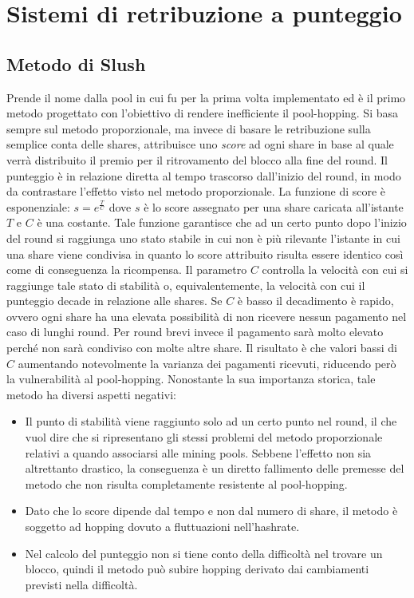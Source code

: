 \section{Sistemi di retribuzione a punteggio}

\subsection{Metodo di Slush}\label{pool-slush}

Prende il nome dalla pool in cui fu per la prima volta implementato ed è il primo metodo progettato con l'obiettivo di rendere inefficiente il pool-hopping.
Si basa sempre sul metodo proporzionale, ma invece di basare le retribuzione sulla semplice conta delle shares, attribuisce uno \emph{score} ad ogni share in base al quale verrà distribuito il premio per il ritrovamento del blocco alla fine del round.
Il punteggio è in relazione diretta al tempo trascorso dall'inizio del round, in modo da contrastare l'effetto visto nel metodo proporzionale. La funzione di score è esponenziale: $s=e^{\frac{T}{C}}$ dove $s$ è lo score assegnato per una share caricata all'istante $T$ e $C$ è una costante.
Tale funzione garantisce che ad un certo punto dopo l'inizio del round si raggiunga uno stato stabile in cui non è più rilevante l'istante in cui una share viene condivisa in quanto lo score attribuito risulta essere identico così come di conseguenza la ricompensa.
Il parametro $C$ controlla la velocità con cui si raggiunge tale stato di stabilità o, equivalentemente, la velocità con cui il punteggio decade in relazione alle shares. Se $C$ è basso il decadimento è rapido, ovvero ogni share ha una elevata possibilità di non ricevere nessun pagamento nel caso di lunghi round. Per round brevi invece il pagamento sarà molto elevato perché non sarà condiviso con molte altre share.
Il risultato è che valori bassi di $C$ aumentando notevolmente la varianza dei pagamenti ricevuti, riducendo però la vulnerabilità al pool-hopping.
Nonostante la sua importanza storica, tale metodo ha diversi aspetti negativi:

\begin{itemize}
	\item Il punto di stabilità viene raggiunto solo ad un certo punto nel round, il che vuol dire che si ripresentano gli stessi problemi del metodo proporzionale relativi a quando associarsi alle mining pools. Sebbene l'effetto non sia altrettanto drastico, la conseguenza è un diretto fallimento delle premesse del metodo che non risulta completamente resistente al pool-hopping.
	\item Dato che lo score dipende dal tempo e non dal numero di share, il metodo è soggetto ad hopping dovuto a fluttuazioni nell'hashrate.
	\item Nel calcolo del punteggio non si tiene conto della difficoltà nel trovare un blocco, quindi il metodo può subire hopping derivato dai cambiamenti previsti nella difficoltà.
\end{itemize}

